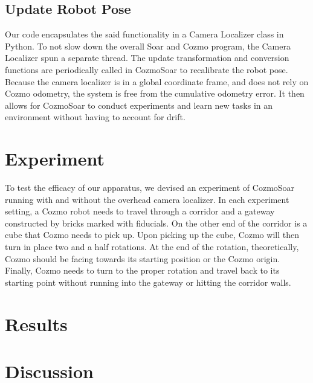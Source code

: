 \documentclass[jou,apacite]{apa6}
\begin{document}
\subsection{Update Robot Pose}
Our code encapsulates the said functionality in a Camera Localizer class in Python. To not slow down the overall Soar and Cozmo program, the Camera Localizer spun a separate thread. The update transformation and conversion functions are periodically called in CozmoSoar to recalibrate the robot pose. Because the camera localizer is in a global coordinate frame, and does not rely on Cozmo odometry, the system is free from the cumulative odometry error. It then allows for CozmoSoar to conduct experiments and learn new tasks in an environment without having to account for drift.

\section{Experiment}
To test the efficacy of our apparatus, we devised an experiment of CozmoSoar running with and without the overhead camera localizer. In each experiment setting, a Cozmo robot needs to travel through a corridor and a gateway constructed by bricks marked with fiducials. On the other end of the corridor is a cube that Cozmo needs to pick up. Upon picking up the cube, Cozmo will then turn in place two and a half rotations. At the end of the rotation, theoretically, Cozmo should be facing towards its starting position or the Cozmo origin. Finally, Cozmo needs to turn to the proper rotation and travel back to its starting point without running into the gateway or hitting the corridor walls.

\section{Results}


\section{Discussion}



\end{document}
